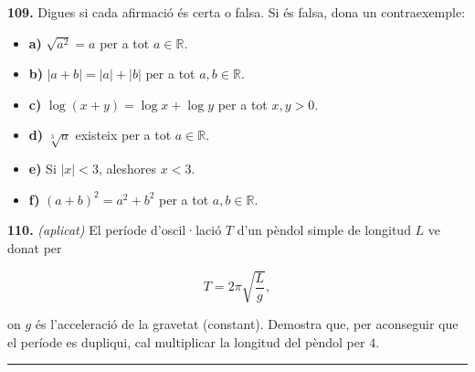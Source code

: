 \documentclass[13pt,a4paper]{extarticle}
\begin{document}
\par\noindent\begin{minipage}{\linewidth}
\textbf{109.} Digues si cada afirmació és certa o falsa. Si és falsa, dona un contraexemple:\par

\begin{itemize}[leftmargin=0pt,itemsep=3pt,topsep=3pt,parsep=0pt,label={}]
\item \textbf{a)} $\sqrt{a^2}=a$ per a tot $a\in\mathbb{R}$.
\item \textbf{b)} $|a+b|=|a|+|b|$ per a tot $a,b\in\mathbb{R}$.
\item \textbf{c)} $\log\left(x+y\right)=\log x+\log y$ per a tot $x,y>0$.
\item \textbf{d)} $\sqrt[3]{a}$ existeix per a tot $a\in\mathbb{R}$.
\item \textbf{e)} Si $|x|<3$, aleshores $x<3$.
\item \textbf{f)} $\left(a+b\right)^2=a^2+b^2$ per a tot $a,b\in\mathbb{R}$.
\end{itemize}
\end{minipage}\par\vspace{1.6mm}
\par\noindent\begin{minipage}{\linewidth}
\textbf{110.} \emph{(aplicat)} El període d'oscil·lació $T$ d'un pèndol simple de longitud $L$ ve donat per\par

$$T=2\pi\sqrt{\dfrac{L}{g}},$$\par

on $g$ és l'acceleració de la gravetat (constant). Demostra que, per aconseguir que el període es dupliqui, cal multiplicar la longitud del pèndol per $4$.\par
\end{minipage}\par\vspace{1.6mm}
\vspace{1mm}\hrule\vspace{3mm}
\end{document}
